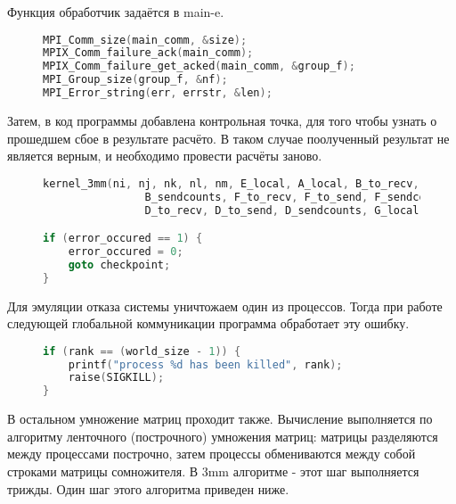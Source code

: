 \documentclass[12pt, oneside, a4paper]{article}
\begin{document}
Функция обработчик задаётся в main-e.

\begin{figure}[h]
\begin{lstlisting}[language=C++]
MPI_Comm_size(main_comm, &size);
MPIX_Comm_failure_ack(main_comm);
MPIX_Comm_failure_get_acked(main_comm, &group_f);
MPI_Group_size(group_f, &nf);
MPI_Error_string(err, errstr, &len);
\end{lstlisting}
\end{figure}

Затем, в код программы добавлена контрольная точка, для того чтобы узнать о прошедшем сбое в результате расчёто. В таком случае поолученный результат не является верным, и необходимо провести расчёты заново.

\begin{figure}[h]
\begin{lstlisting}[language=C++]
kernel_3mm(ni, nj, nk, nl, nm, E_local, A_local, B_to_recv, B_to_send,
                B_sendcounts, F_to_recv, F_to_send, F_sendcounts, C_local,
                D_to_recv, D_to_send, D_sendcounts, G_local);

if (error_occured == 1) {
	error_occured = 0;
	goto checkpoint;
}
\end{lstlisting}
\end{figure}

Для эмуляции отказа системы уничтожаем один из процессов. Тогда при работе следующей глобальной коммуникации программа обработает эту ошибку.

\begin{figure}[h]
\begin{lstlisting}[language=C++]
if (rank == (world_size - 1)) {
	printf("process %d has been killed", rank);
	raise(SIGKILL);
}
\end{lstlisting}
\end{figure}

В остальном умножение матриц проходит также. Вычисление выполняется по алгоритму ленточного (построчного) умножения матриц: матрицы разделяются между процессами построчно, затем процессы обмениваются между собой строками матрицы сомножителя. В 3mm алгоритме - этот шаг выполняется трижды. Один шаг этого алгоритма приведен ниже.

\vspace{600pt}
\end{document}
